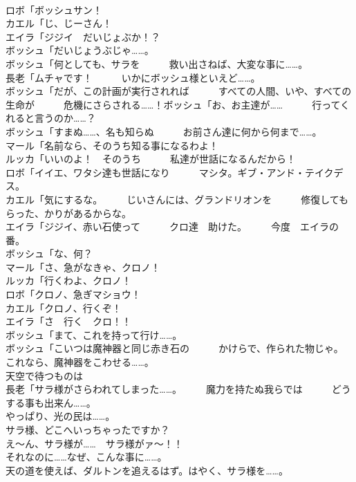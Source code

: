 \documentclass[8pt]{extreport}
\begin{document}
\begin{CJK}{UTF8}{min}
\\	ロボ「ボッシュサン！	
\\	カエル「じ、じーさん！	
\\	エイラ「ジジイ　だいじょぶか！？	
\\	ボッシュ「だいじょうぶじゃ……。	
\\	ボッシュ「何としても、サラを　　　救い出さねば、大変な事に……。	
\\	長老「ムチャです！　　　いかにボッシュ様といえど……。	
\\	ボッシュ「だが、この計画が実行されれば　　　すべての人間、いや、すべての生命が　　　危機にさらされる……！ボッシュ「お、お主達が……　　　行ってくれると言うのか……？	
\\	ボッシュ「すまぬ……、名も知らぬ　　　お前さん達に何から何まで……。	
\\	マール「名前なら、そのうち知る事になるわよ！	
\\	ルッカ「いいのよ！　そのうち　　　私達が世話になるんだから！	
\\	ロボ「イイエ、ワタシ達も世話になり　　　マシタ。ギブ・アンド・テイクデス。	
\\	カエル「気にするな。　　　じいさんには、グランドリオンを　　　修復してもらった、かりがあるからな。	
\\	エイラ「ジジイ、赤い石使って　　　クロ達　助けた。　　　今度　エイラの番。	
\\	ボッシュ「な、何？	
\\	マール「さ、急がなきゃ、クロノ！	
\\	ルッカ「行くわよ、クロノ！	
\\	ロボ「クロノ、急ぎマショウ！	
\\	カエル「クロノ、行くぞ！	
\\	エイラ「さ　行く　クロ！！	
\\	ボッシュ「まて、これを持って行け……。	
\\	ボッシュ「こいつは魔神器と同じ赤き石の　　　かけらで、作られた物じゃ。　　　これなら、魔神器をこわせる……。	
\\	天空で待つものは	
\\	長老「サラ様がさらわれてしまった……。　　　魔力を持たぬ我らでは　　　どうする事も出来ん……。	
\\	やっぱり、光の民は……。	
\\	サラ様、どこへいっちゃったですか？	
\\	え～ん、サラ様が……　サラ様がァ～！！	
\\	それなのに……なぜ、こんな事に……。	
\\	天の道を使えば、ダルトンを追えるはず。はやく、サラ様を……。	

\end{CJK}
\end{document}
